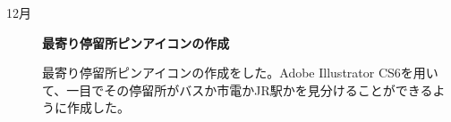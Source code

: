 ﻿\begin{description}
 \item[12月] \textbf{最寄り停留所ピンアイコンの作成}\par
 最寄り停留所ピンアイコンの作成をした。Adobe Illustrator CS6を用いて、一目でその停留所がバスか市電かJR駅かを見分けることができるように作成した。
  \par
\end{description}
